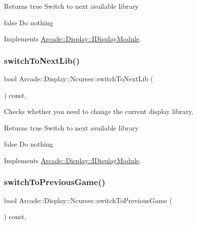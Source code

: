 \begin{DoxyReturn}{Returns}
true Switch to next available library 

false Do nothing 
\end{DoxyReturn}


Implements \mbox{\hyperlink{classArcade_1_1Display_1_1IDisplayModule_a9584cb0ca3b157c9a4ec94509e4f8e32}{Arcade\+::\+Display\+::\+I\+Display\+Module}}.

\mbox{\label{classArcade_1_1Display_1_1Ncurses_a921c8a8559cd48419aafda8e34c1b653}} 
\subsubsection{\texorpdfstring{switchToNextLib()}{switchToNextLib()}}
{\footnotesize\ttfamily bool Arcade\+::\+Display\+::\+Ncurses\+::switch\+To\+Next\+Lib (\begin{DoxyParamCaption}{ }\end{DoxyParamCaption}) const\hspace{0.3cm}{\ttfamily [final]}, {\ttfamily [virtual]}}



Checks whether you need to change the current display library. 

\begin{DoxyReturn}{Returns}
true Switch to next available library 

false Do nothing 
\end{DoxyReturn}


Implements \mbox{\hyperlink{classArcade_1_1Display_1_1IDisplayModule_a0de47361c9d47bf8fc52070b945f23b7}{Arcade\+::\+Display\+::\+I\+Display\+Module}}.

\mbox{\label{classArcade_1_1Display_1_1Ncurses_ad2e7818db1e8f3328083ed6cab2f7517}} 
\subsubsection{\texorpdfstring{switchToPreviousGame()}{switchToPreviousGame()}}
{\footnotesize\ttfamily bool Arcade\+::\+Display\+::\+Ncurses\+::switch\+To\+Previous\+Game (\begin{DoxyParamCaption}{ }\end{DoxyParamCaption}) const\hspace{0.3cm}{\ttfamily [final]}, {\ttfamily [virtual]}}



